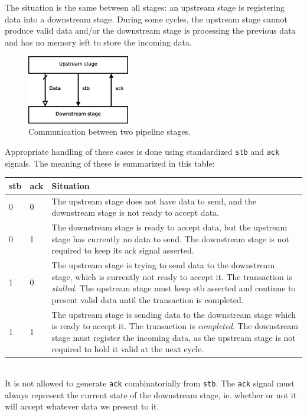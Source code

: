 \documentclass[a4paper,11pt]{article}
\begin{document}
The situation is the same between all stages: an upstream stage is registering data into a downstream stage. During some cycles, the upstream stage cannot produce valid data and/or the downstream stage is processing the previous data and has no memory left to store the incoming data.

\begin{figure}[H]
\centering
\includegraphics[height=30mm]{comm.eps}
\caption{Communication between two pipeline stages.}\label{fig:comm}
\end{figure}

Appropriate handling of these cases is done using standardized \verb!stb! and \verb!ack! signals. The meaning of these is summarized in this table:\\

\begin{tabularx}{\textwidth}{|l|l|X|}
\hline
\bf stb & \bf ack & \bf Situation \\
\hline
0 & 0 & The upstream stage does not have data to send, and the downstream stage is not ready to accept data. \\
\hline
0 & 1 & The downstream stage is ready to accept data, but the upstream stage has currently no data to send. The downstream stage is not required to keep its ack signal asserted. \\
\hline
1 & 0 & The upstream stage is trying to send data to the downstream stage, which is currently not ready to accept it. The transaction is \textit{stalled}. The upstream stage must keep stb asserted and continue to present valid data until the transaction is completed. \\
\hline
1 & 1 & The upstream stage is sending data to the downstream stage which is ready to accept it. The transaction is \textit{completed}. The downstream stage must register the incoming data, as the upstream stage is not required to hold it valid at the next cycle. \\
\hline
\end{tabularx}\\

It is not allowed to generate \verb!ack! combinatorially from \verb!stb!. The \verb!ack! signal must always represent the current state of the downstream stage, ie. whether or not it will accept whatever data we present to it.
\end{document}
